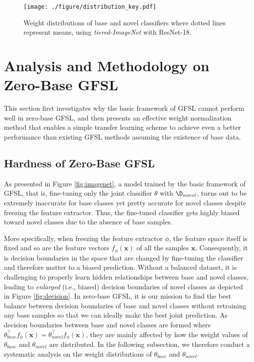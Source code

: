 
\begin{figure}[t]
	\centering
	\texttt{[image: ./figure/distribution\_key.pdf]}
\caption{Weight distributions of base and novel classifiers where dotted lines represent means, using \textit{tiered-ImageNet} with ResNet-18.}
	\label{fig:shifting}
	\vspace{-2mm}
\end{figure}

\section{Analysis and Methodology on Zero-Base GFSL} \label{sec:anaylsis}

This section first investigates why the basic framework of GFSL cannot perform well in zero-base GFSL, and then presents an effective weight normalization method that enables a simple transfer learning scheme to achieve even a better performance than existing GFSL methods assuming the existence of base data.

\subsection{Hardness of Zero-Base GFSL}
As presented in Figure \ref{fig:imagenet}, a model trained by the basic framework of GFSL, that is, fine-tuning only the joint classifier $\theta$ with $\D_{novel}$, turns out to be extremely inaccurate for base classes yet pretty accurate for novel classes despite freezing the feature extractor. Thus, the fine-tuned classifier gets highly biased toward novel classes due to the absence of base samples. 

More specifically, when freezing the feature extractor $\phi$, the feature space itself is fixed and so are the feature vectors $f_\phi(\mathbf{x})$ of all the samples $\mathbf{x}$. Consequently, it is 
decision boundaries in the space that are changed by fine-tuning the classifier and therefore matter to a biased prediction. Without a balanced dataset, it is challenging to properly learn hidden relationships between base and novel classes, leading to \textit{enlarged} (i.e., biased) decision boundaries of novel classes as depicted in Figure \ref{fig:decision}. In zero-base GFSL, it is our mission to find the best balance between decision boundaries of base and novel classes without retraining any base samples so that we can ideally make the best joint prediction. As decision boundaries between base and novel classes are formed where $\theta_{base}^\top f_\phi(\mathbf{x}) = \theta_{novel}^\top f_\phi(\mathbf{x})$, they are mainly affected by how the weight values of $\theta_{base}$ and $\theta_{novel}$ are distributed. In the following subsection, we therefore conduct a systematic analysis on the weight distributions of $\theta_{base}$ and $\theta_{novel}$.

